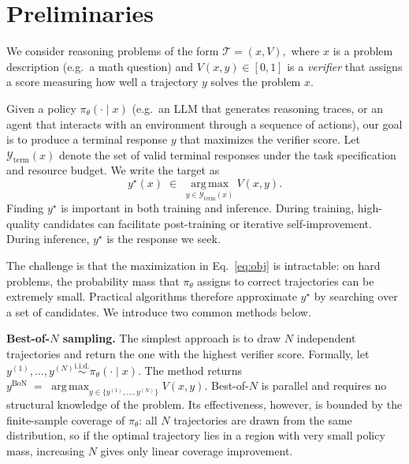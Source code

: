 \section{Preliminaries}
\label{sec:problem}

We consider reasoning problems of the form
$
  \mathcal{T} = (x, V),
$
where $x$ is a problem description (e.g.\ a math question) and
$V(x,y) \in [0,1]$ is a \emph{verifier} that
assigns a score measuring how well a trajectory $y$
solves the problem $x$.

Given a policy $\pi_\theta(\cdot\mid x)$ (e.g.\ an LLM that generates reasoning traces, or an agent that interacts with an environment through a sequence of actions), our goal is to produce a terminal response $y$ that maximizes the verifier score. Let
$\mathcal{Y}_{\mathrm{term}}(x)$ denote the set of valid terminal responses
under the task specification and resource budget. We write the target as
\begin{equation}
  y^{\star}(x) \;\in\; \operatorname*{arg\,max}_{y\in\mathcal{Y}_{\mathrm{term}}(x)}
                       V(x, y).
  \label{eq:obj}
\end{equation}
Finding $y^{\star}$ is important in both training and inference. During
training, high-quality candidates can facilitate post-training or
iterative self-improvement. During inference, $y^{\star}$ is the response
we seek.

The challenge is that the maximization in Eq.~\eqref{eq:obj} is intractable:
on hard problems, the probability mass that $\pi_\theta$ assigns to correct
trajectories can be extremely small. Practical algorithms therefore
approximate $y^{\star}$ by searching over a set of candidates. We 
introduce two common methods below.

\textbf{Best-of-$N$ sampling.}
The simplest approach is to draw $N$ independent trajectories and return the one with the highest verifier score. Formally, let $y^{(1)}, \dots, y^{(N)} \overset{\text{i.i.d.}}{\sim} \pi_\theta(\cdot \mid x)$. The method returns $ y^{\mathrm{BoN}} \;=\; \operatorname*{arg\,max}_{y \in \{y^{(1)}, \dots, y^{(N)}\}} V(x, y) $.
Best-of-$N$ is parallel and requires no structural knowledge of the problem. Its effectiveness, however, is bounded by the finite-sample coverage of $\pi_\theta$: all $N$ trajectories are drawn from the same distribution, so if the optimal trajectory lies in a region with very small policy mass, increasing $N$ gives only linear coverage improvement.

